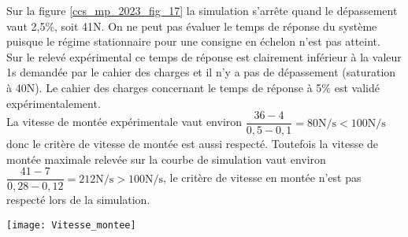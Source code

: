 \fi



\ifprof
\begin{corrige}
Sur la figure \ref{ccs_mp_2023_fig_17} la simulation s'arrête quand le dépassement vaut 2,5\%, soit 41N. On ne peut pas évaluer le temps de réponse du système puisque le régime stationnaire pour une consigne en échelon n'est pas atteint.\\

Sur le relevé expérimental ce temps de réponse est clairement inférieur à la valeur 1s demandée par le cahier des charges et il n'y a pas de dépassement (saturation à 40N). Le cahier des charges concernant le temps de réponse à 5\% est validé expérimentalement.\\

La vitesse de montée expérimentale vaut environ $\dfrac{36 - 4}{0,5 -0,1} = 80\text{N/s} < 100\text{N/s}$ donc le critère de vitesse de montée est aussi respecté. Toutefois la vitesse de montée maximale relevée sur la courbe de simulation vaut environ $\dfrac{41 - 7}{0,28 -0,12} = 212\text{N/s} > 100\text{N/s}$, le critère de vitesse en montée n'est pas respecté lors de la simulation.  

\begin{center}
\texttt{[image: Vitesse\_montee]}
\end{center}

\end{corrige}
\else
\fi

